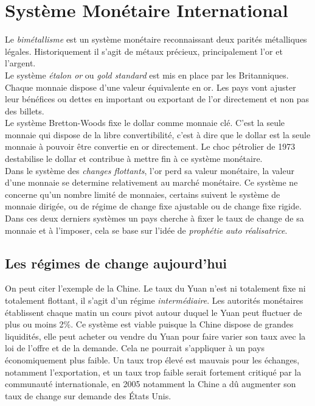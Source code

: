 \documentclass[main.tex]{subfiles}
\begin{document}
        \section{Système Monétaire International}

        \startchronology[startyear=1800,stopyear=2020, color=gray,height=7ex,width=\hsize, arrow=false]
        \endchronology

        Le \emph{bimétallisme} est un système monétaire reconnaissant deux parités métalliques légales. Historiquement il s'agit de métaux précieux, principalement l'or et l'argent. \\

        Le système \emph{étalon or} ou \emph{gold standard} est mis en place par les Britanniques. Chaque monnaie dispose d'une valeur équivalente en or. Les pays vont ajuster leur bénéfices ou dettes en important ou exportant de l'or directement et non pas des billets. \\

        Le système Bretton-Woods fixe le dollar comme monnaie clé. C'est la seule monnaie qui dispose de la libre convertibilité, c'est à dire que le dollar est la seule monnaie à pouvoir être convertie en or directement. Le choc pétrolier de 1973 destabilise le dollar et contribue à mettre fin à ce système monétaire. \\

        Dans le système des \emph{changes flottants}, l'or perd sa valeur monétaire, la valeur d'une monnaie se determine relativement au marché monétaire. Ce système ne concerne qu'un nombre limité de monnaies, certains suivent le système de monnaie dirigée, ou de régime de change fixe ajustable ou de change fixe rigide. Dans ces deux derniers systèmes un pays cherche à fixer le taux de change de sa monnaie et à l'imposer, cela se base sur l'idée de \emph{prophétie auto réalisatrice}.

        \subsection{Les régimes de change aujourd'hui}
        On peut citer l'exemple de la Chine. Le taux du Yuan n'est ni totalement fixe ni totalement flottant, il s'agit d'un régime \emph{intermédiaire}. Les autorités monétaires établissent chaque matin un cours pivot autour duquel le Yuan peut fluctuer de plus ou moins 2\%. Ce système est viable puisque la Chine dispose de grandes liquidités, elle peut acheter ou vendre du Yuan pour faire varier son taux avec la loi de l'offre et de la demande. Cela ne pourrait s'appliquer à un pays économiquement plus faible. Un taux trop élevé est mauvais pour les échanges, notamment l'exportation, et un taux trop faible serait fortement critiqué par la communauté internationale, en 2005 notamment la Chine a dû augmenter son taux de change sur demande des États Unis.
\end{document}
